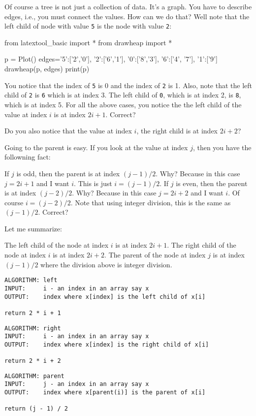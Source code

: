 Of course a tree is not just a collection of data.
It's a graph.
You have to describe edges, i.e., you must
connect the values.
How can we do that?
Well note that the left child of node with value \verb!5! is 
the node with value \verb!2!:

\begin{python}
from latextool_basic import *
from drawheap import *

p = Plot()
edges={'5':['2','0'],
       '2':['6','1'],
       '0':['8','3'],
       '6':['4', '7'],
       '1':['9']}
drawheap(p, edges)
print(p)
\end{python}

You notice that the index of \verb!5! is 0 and the index of 
\verb!2! is 1.
Also, note that the left child of \verb!2! is \verb!6!
which is at index 3.
The left child of \verb!0!, which is at index 2, is \verb!8!,
which is at index 5.
For all the above cases,
you notice the the left child of the value at index $i$
is at index $2i + 1$.
Correct?

Do you also notice that the value at index $i$, the
right child is at index $2i + 2$?

Going to the parent is easy.
If you look at the value at index $j$,
then you have the followning fact:
\begin{tightlist}
\li If $j$ is odd, then the parent is at index $(j - 1) / 2$.
Why? Because in this case $j = 2i + 1$ and I want $i$.
This is just $i = (j - 1) / 2$.
\li If $j$ is even, then the parent is at index $(j - 2)/ 2$.
Why? Because in this case $j = 2i + 2$ and I want $i$.
Of course $i = (j - 2) / 2$.
Note that using integer division, this is the same as
$(j - 1) / 2$.
Correct?
\end{tightlist}

Let me summarize:
\begin{tightlist}
\li The left child of the node at index $i$ is at index $2i+1$.
\li The right child of the node at index $i$ is at index $2i+2$.
\li The parent of the node at index $j$ is at index $(j - 1)/2$
    where the division above is integer division.
\end{tightlist}


\begin{Verbatim}[frame=single]
ALGORITHM: left
INPUT:     i - an index in an array say x
OUTPUT:    index where x[index] is the left child of x[i]

return 2 * i + 1
\end{Verbatim}
\begin{Verbatim}[frame=single]
ALGORITHM: right
INPUT:     i - an index in an array say x
OUTPUT:    index where x[index] is the right child of x[i]

return 2 * i + 2
\end{Verbatim}
\begin{Verbatim}[frame=single]
ALGORITHM: parent
INPUT:     j - an index in an array say x
OUTPUT:    index where x[parent(i)] is the parent of x[i]

return (j - 1) / 2
\end{Verbatim}

